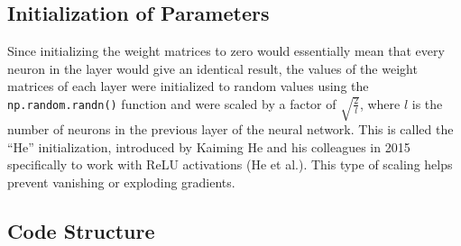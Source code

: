 \documentclass{article}
\begin{document}
\subsection{Initialization of Parameters}
Since initializing the weight matrices to zero would essentially mean that every neuron in the layer would give an identical result, the values of the weight matrices of each layer were initialized to random values using the \verb|np.random.randn()| function and were scaled by a factor of $\sqrt{\frac{2}{l}}$, where $l$ is the number of neurons in the previous layer of the neural network. This is called the ``He'' initialization, introduced by Kaiming He and his colleagues in 2015 specifically to work with ReLU activations (He et al.). This type of scaling helps prevent vanishing or exploding gradients.

\subsection{Code Structure}
\end{document}

